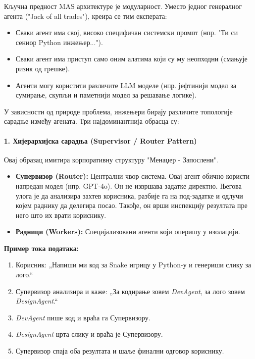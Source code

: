 Кључна предност MAS архитектуре је модуларност. Уместо једног генералног агента ("Jack of all trades"), креира се тим експерата:
\begin{itemize}
    \item Сваки агент има свој, високо специфичан системски промпт (нпр. "Ти си сениор Python инжењер...").
    \item Сваки агент има приступ само оним алатима који су му неопходни (смањује ризик од грешке).
    \item Агенти могу користити различите LLM моделе (нпр. јефтинији модел за сумирање, скупљи и паметнији модел за решавање логике).
\end{itemize}

У зависности од природе проблема, инжењери бирају различите топологије сарадње између агената. Три најдоминантнија обрасца су:

\paragraph*{1. Хијерархијска сарадња (Supervisor / Router Pattern)}
Овај образац имитира корпоративну структуру "Менаџер - Запослени".

\begin{itemize}
    \item \textbf{Супервизор (Router):} Централни чвор система. Овај агент обично користи напредан модел (нпр. GPT-4o). Он не извршава задатке директно. Његова улога је да анализира захтев корисника, разбије га на под-задатке и одлучи којем раднику да делегира посао. Такође, он врши инспекцију резултата пре него што их врати кориснику.
    \item \textbf{Радници (Workers):} Специјализовани агенти који оперишу у изолацији.
\end{itemize}

\textbf{Пример тока података:}
\begin{enumerate}
    \item Корисник: „Напиши ми код за Snake игрицу у Python-у и генериши слику за лого.“
    \item Супервизор анализира и каже: „За кодирање зовем \textit{DevAgent}, за лого зовем \textit{DesignAgent}.“
    \item \textit{DevAgent} пише код и враћа га Супервизору.
    \item \textit{DesignAgent} црта слику и враћа је Супервизору.
    \item Супервизор спаја оба резултата и шаље финални одговор кориснику.
\end{enumerate}

